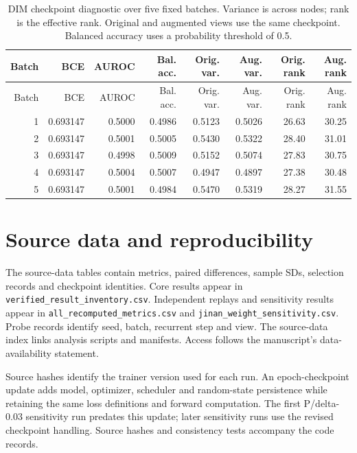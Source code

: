 \documentclass[a4paper,10pt]{article}
\begin{document}
\begingroup\footnotesize\setlength{\tabcolsep}{4pt}
\begin{longtable}{rrrrrrrr}
\caption{DIM checkpoint diagnostic over five fixed batches. Variance is across nodes; rank is the effective rank. Original and augmented views use the same checkpoint. Balanced accuracy uses a probability threshold of 0.5.}\\
\toprule
Batch & BCE & AUROC & Bal. acc. & Orig. var. & Aug. var. & Orig. rank & Aug. rank \\
\midrule\endfirsthead
\toprule
Batch & BCE & AUROC & Bal. acc. & Orig. var. & Aug. var. & Orig. rank & Aug. rank \\
\midrule\endhead

1 & 0.693147 & 0.5000 & 0.4986 & 0.5123 & 0.5026 & 26.63 & 30.25 \\

2 & 0.693147 & 0.5001 & 0.5005 & 0.5430 & 0.5322 & 28.40 & 31.01 \\

3 & 0.693147 & 0.4998 & 0.5009 & 0.5152 & 0.5074 & 27.83 & 30.75 \\

4 & 0.693147 & 0.5004 & 0.5007 & 0.4947 & 0.4897 & 27.38 & 30.48 \\

5 & 0.693147 & 0.5001 & 0.4984 & 0.5470 & 0.5319 & 28.27 & 31.55 \\

\bottomrule
\end{longtable}\endgroup

\section{Source data and reproducibility}
The source-data tables contain metrics, paired differences, sample SDs, selection records and checkpoint identities. Core results appear in \texttt{verified\_result\_inventory.csv}. Independent replays and sensitivity results appear in \texttt{all\_recomputed\_metrics.csv} and \texttt{jinan\_weight\_sensitivity.csv}. Probe records identify seed, batch, recurrent step and view. The source-data index links analysis scripts and manifests. Access follows the manuscript's data-availability statement.

Source hashes identify the trainer version used for each run. An epoch-checkpoint update adds model, optimizer, scheduler and random-state persistence while retaining the same loss definitions and forward computation. The first P/delta-0.03 sensitivity run predates this update; later sensitivity runs use the revised checkpoint handling. Source hashes and consistency tests accompany the code records.
\end{document}
